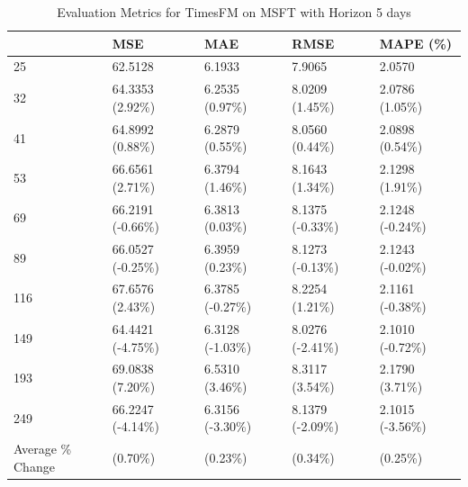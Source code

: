 \begin{table}
\caption{Evaluation Metrics for TimesFM on MSFT with Horizon 5 days}
\label{tab:fm_MSFT_h5_metrics}
\begin{tabular}{lllll}
\toprule
 & MSE & MAE & RMSE & MAPE (\%) \\
\midrule
25 & 62.5128 & 6.1933 & 7.9065 & 2.0570 \\
32 & 64.3353 (2.92\%) & 6.2535 (0.97\%) & 8.0209 (1.45\%) & 2.0786 (1.05\%) \\
41 & 64.8992 (0.88\%) & 6.2879 (0.55\%) & 8.0560 (0.44\%) & 2.0898 (0.54\%) \\
53 & 66.6561 (2.71\%) & 6.3794 (1.46\%) & 8.1643 (1.34\%) & 2.1298 (1.91\%) \\
69 & 66.2191 (-0.66\%) & 6.3813 (0.03\%) & 8.1375 (-0.33\%) & 2.1248 (-0.24\%) \\
89 & 66.0527 (-0.25\%) & 6.3959 (0.23\%) & 8.1273 (-0.13\%) & 2.1243 (-0.02\%) \\
116 & 67.6576 (2.43\%) & 6.3785 (-0.27\%) & 8.2254 (1.21\%) & 2.1161 (-0.38\%) \\
149 & 64.4421 (-4.75\%) & 6.3128 (-1.03\%) & 8.0276 (-2.41\%) & 2.1010 (-0.72\%) \\
193 & 69.0838 (7.20\%) & 6.5310 (3.46\%) & 8.3117 (3.54\%) & 2.1790 (3.71\%) \\
249 & 66.2247 (-4.14\%) & 6.3156 (-3.30\%) & 8.1379 (-2.09\%) & 2.1015 (-3.56\%) \\
Average \% Change & (0.70\%) & (0.23\%) & (0.34\%) & (0.25\%) \\
\bottomrule
\end{tabular}
\end{table}
